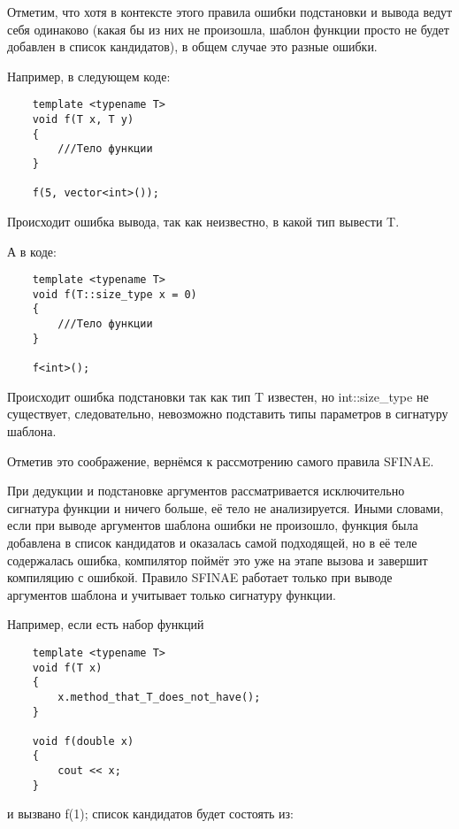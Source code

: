 	\vspace{\baselineskip}	
	
	Отметим, что хотя в контексте этого правила ошибки подстановки и вывода ведут себя одинаково (какая бы из них не произошла, шаблон функции просто не будет добавлен в список кандидатов), в общем случае это разные ошибки.
	
	Например, в следующем коде:
	
	\begin{verbatim}
	template <typename T>
	void f(T x, T y)
	{
	    ///Тело функции
	}
	
	f(5, vector<int>());
	\end{verbatim}
	
	Происходит ошибка вывода, так как неизвестно, в какой тип вывести T.
	
	А в коде:
	
	\begin{verbatim}
	template <typename T>
	void f(T::size_type x = 0)
	{
	    ///Тело функции
	}
	
	f<int>();
	\end{verbatim}
	
	Происходит ошибка подстановки так как тип T известен, но int::size\_type не существует, следовательно, невозможно подставить типы параметров в сигнатуру шаблона.
	
	Отметив это соображение, вернёмся к рассмотрению самого правила SFINAE.
	
	\vspace{\baselineskip}	
	
	При дедукции и подстановке аргументов рассматривается исключительно сигнатура функции и ничего больше, её тело не анализируется. Иными словами, если при выводе аргументов шаблона ошибки не произошло, функция была добавлена в список кандидатов и оказалась самой подходящей, но в её теле содержалась ошибка, компилятор поймёт это уже на этапе вызова и завершит компиляцию с ошибкой. Правило SFINAE работает только при выводе аргументов шаблона и учитывает только сигнатуру функции.

	Например, если есть набор функций

	\begin{verbatim}
	template <typename T>
	void f(T x)
	{
	    x.method_that_T_does_not_have();
	}

	void f(double x)
	{
	    cout << x;
	}
	\end{verbatim}
	
	и вызвано f(1);
	список кандидатов будет состоять из:
	
